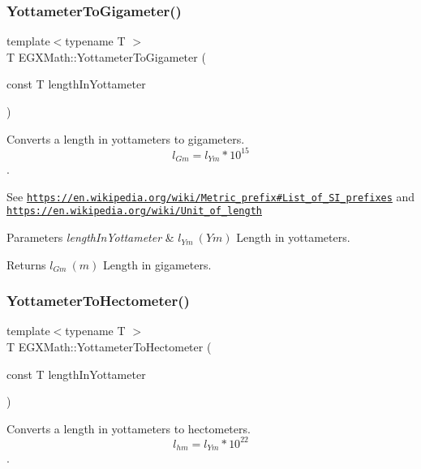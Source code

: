 \subsubsection{\texorpdfstring{Yottameter\+To\+Gigameter()}{YottameterToGigameter()}}
{\footnotesize\ttfamily template$<$typename T $>$ \\
T E\+G\+X\+Math\+::\+Yottameter\+To\+Gigameter (\begin{DoxyParamCaption}\item[{const T}]{length\+In\+Yottameter }\end{DoxyParamCaption})}



Converts a length in yottameters to gigameters. \[ l_{Gm}=l_{Ym} * 10^{15} \]. 

See \href{https://en.wikipedia.org/wiki/Metric_prefix#List_of_SI_prefixes}{\tt https\+://en.\+wikipedia.\+org/wiki/\+Metric\+\_\+prefix\#\+List\+\_\+of\+\_\+\+S\+I\+\_\+prefixes} and \href{https://en.wikipedia.org/wiki/Unit_of_length}{\tt https\+://en.\+wikipedia.\+org/wiki/\+Unit\+\_\+of\+\_\+length} 
\begin{DoxyParams}{Parameters}
{\em length\+In\+Yottameter} & $ l_{Ym}\ (Ym)$ Length in yottameters. \\
\hline
\end{DoxyParams}
\begin{DoxyReturn}{Returns}
$ l_{Gm}\ (m)$ Length in gigameters. 
\end{DoxyReturn}
\mbox{\label{group___e_g_x_math-_conversions-_length_conversions-_s_i-_yottameter-_s_i_ga3c7aed6e299bc4f0288d0672a7262320}} 
\subsubsection{\texorpdfstring{Yottameter\+To\+Hectometer()}{YottameterToHectometer()}}
{\footnotesize\ttfamily template$<$typename T $>$ \\
T E\+G\+X\+Math\+::\+Yottameter\+To\+Hectometer (\begin{DoxyParamCaption}\item[{const T}]{length\+In\+Yottameter }\end{DoxyParamCaption})}



Converts a length in yottameters to hectometers. \[ l_{hm}=l_{Ym} * 10^{22} \]. 

